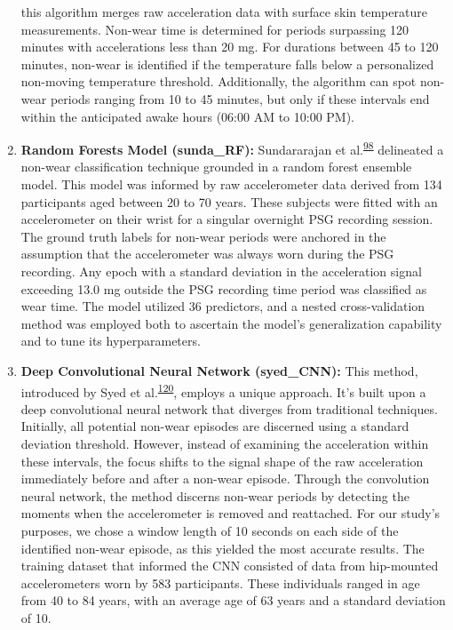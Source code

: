 \documentclass[
  10pt,
]{scrbook}
\let\originaltextbf\textbf
\renewcommand{\textbf}[1]{\textcolor{color1}{\originaltextbf{#1}}}
\begin{document}
\begin{enumerate}
  this algorithm merges raw acceleration data with surface skin
  temperature measurements. Non-wear time is determined for periods
  surpassing 120 minutes with accelerations less than 20 mg. For
  durations between 45 to 120 minutes, non-wear is identified if the
  temperature falls below a personalized non-moving temperature
  threshold. Additionally, the algorithm can spot non-wear periods
  ranging from 10 to 45 minutes, but only if these intervals end within
  the anticipated awake hours (06:00 AM to 10:00 PM).
\item
  \textsf{\textbf{Random Forests Model (sunda\_RF):}} Sundararajan et
  al.\textsuperscript{\protect\hyperlink{ref-sundararajan_sleep_2021}{98}}
  delineated a non-wear classification technique grounded in a random
  forest ensemble model. This model was informed by raw accelerometer
  data derived from 134 participants aged between 20 to 70 years. These
  subjects were fitted with an accelerometer on their wrist for a
  singular overnight PSG recording session. The ground truth labels for
  non-wear periods were anchored in the assumption that the
  accelerometer was always worn during the PSG recording. Any epoch with
  a standard deviation in the acceleration signal exceeding 13.0 mg
  outside the PSG recording time period was classified as wear time. The
  model utilized 36 predictors, and a nested cross-validation method was
  employed both to ascertain the model's generalization capability and
  to tune its hyperparameters.
\item
  \textsf{\textbf{Deep Convolutional Neural Network (syed\_CNN):}} This
  method, introduced by Syed et
  al.\textsuperscript{\protect\hyperlink{ref-syed_novel_2021}{120}},
  employs a unique approach. It's built upon a deep convolutional neural
  network that diverges from traditional techniques. Initially, all
  potential non-wear episodes are discerned using a standard deviation
  threshold. However, instead of examining the acceleration within these
  intervals, the focus shifts to the signal shape of the raw
  acceleration immediately before and after a non-wear episode. Through
  the convolution neural network, the method discerns non-wear periods
  by detecting the moments when the accelerometer is removed and
  reattached. For our study's purposes, we chose a window length of 10
  seconds on each side of the identified non-wear episode, as this
  yielded the most accurate results. The training dataset that informed
  the CNN consisted of data from hip-mounted accelerometers worn by 583
  participants. These individuals ranged in age from 40 to 84 years,
  with an average age of 63 years and a standard deviation of 10.
\end{enumerate}
\end{document}
